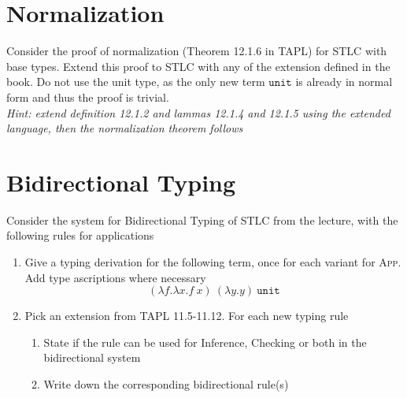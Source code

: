 \section{Normalization}
Consider the proof of normalization (Theorem 12.1.6 in TAPL) for STLC with base types.
Extend this proof to STLC with any of the extension defined in the book. 
Do not use the unit type, as the only new term $\mathtt{unit}$ is already in normal form and thus the proof is trivial.\\
\emph{Hint: extend definition 12.1.2 and lammas 12.1.4 and 12.1.5 using the extended language, then the normalization theorem follows}

\section{Bidirectional Typing}
Consider the system for Bidirectional Typing of STLC from the lecture, with the following rules for applications\\
\begin{minipage}{\textwidth}
  \begin{minipage}{0.45\textwidth}
    \begin{prooftree}
    \end{prooftree}
  \end{minipage}
  \hfill
  \begin{minipage}{0.45\textwidth}
    \begin{prooftree}
    \end{prooftree}
    \hfill
  \end{minipage}
  \hfill
  \vspace{2em}
\end{minipage}
\begin{enumerate}
  \item Give a typing derivation for the following term, once for each variant for \textsc{App}. Add type ascriptions where necessary\\
    $$ (\lambda f. \lambda x. f\ x)\ (\lambda y.y)\ \mathtt{unit}$$
  \item Pick an extension from TAPL 11.5-11.12. For each new typing rule
    \begin{enumerate}
      \item State if the rule can be used for Inference, Checking or both in the bidirectional system 
      \item Write down the corresponding bidirectional rule(s)
    \end{enumerate}
\end{enumerate}

